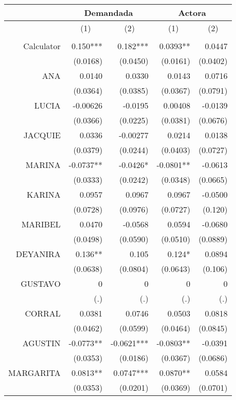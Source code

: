 \begin{tabular}{rrrrr}
\toprule
      & \multicolumn{2}{c}{Demandada} & \multicolumn{2}{c}{Actora} \\
\midrule
      & \multicolumn{1}{c}{(1)} & \multicolumn{1}{c}{(2)} & \multicolumn{1}{c}{(1)} & \multicolumn{1}{c}{(2)} \\
      &       &       &       &  \\
Calculator & 0.150*** & 0.182*** & 0.0393** & 0.0447 \\
      & (0.0168) & (0.0450) & (0.0161) & (0.0402) \\
ANA   & 0.0140 & 0.0330 & 0.0143 & 0.0716 \\
      & (0.0364) & (0.0385) & (0.0367) & (0.0791) \\
LUCIA & -0.00626 & -0.0195 & 0.00408 & -0.0139 \\
      & (0.0366) & (0.0225) & (0.0381) & (0.0676) \\
JACQUIE & 0.0336 & -0.00277 & 0.0214 & 0.0138 \\
      & (0.0379) & (0.0244) & (0.0403) & (0.0727) \\
MARINA & -0.0737** & -0.0426* & -0.0801** & -0.0613 \\
      & (0.0333) & (0.0242) & (0.0348) & (0.0665) \\
KARINA & 0.0957 & 0.0967 & 0.0967 & -0.0500 \\
      & (0.0728) & (0.0976) & (0.0727) & (0.120) \\
MARIBEL & 0.0470 & -0.0568 & 0.0594 & -0.0680 \\
      & (0.0498) & (0.0590) & (0.0510) & (0.0889) \\
DEYANIRA & 0.136** & 0.105 & 0.124* & 0.0894 \\
      & (0.0638) & (0.0804) & (0.0643) & (0.106) \\
GUSTAVO & 0     & 0     & 0     & 0 \\
      & (.)   & (.)   & (.)   & (.) \\
CORRAL & 0.0381 & 0.0746 & 0.0503 & 0.0818 \\
      & (0.0462) & (0.0599) & (0.0464) & (0.0845) \\
AGUSTIN & -0.0773** & -0.0621*** & -0.0803** & -0.0391 \\
      & (0.0353) & (0.0186) & (0.0367) & (0.0686) \\
MARGARITA & 0.0813** & 0.0747*** & 0.0870** & 0.0584 \\
      & (0.0353) & (0.0201) & (0.0369) & (0.0701) \\

\end{tabular}
